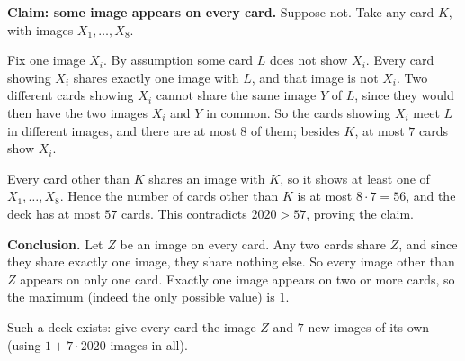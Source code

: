 \textbf{Claim: some image appears on every card.} Suppose not. Take any card $K$, with images $X_1,\ldots,X_8$.

Fix one image $X_i$. By assumption some card $L$ does not show $X_i$. Every card showing $X_i$ shares exactly one image with $L$, and that image is not $X_i$. Two different cards showing $X_i$ cannot share the same image $Y$ of $L$, since they would then have the two images $X_i$ and $Y$ in common. So the cards showing $X_i$ meet $L$ in different images, and there are at most $8$ of them; besides $K$, at most $7$ cards show $X_i$.

Every card other than $K$ shares an image with $K$, so it shows at least one of $X_1,\ldots,X_8$. Hence the number of cards other than $K$ is at most $8\cdot7=56$, and the deck has at most $57$ cards. This contradicts $2020>57$, proving the claim.

\textbf{Conclusion.} Let $Z$ be an image on every card. Any two cards share $Z$, and since they share exactly one image, they share nothing else. So every image other than $Z$ appears on only one card. Exactly one image appears on two or more cards, so the maximum (indeed the only possible value) is $\boxed{1}$.

Such a deck exists: give every card the image $Z$ and $7$ new images of its own (using $1+7\cdot2020$ images in all).
